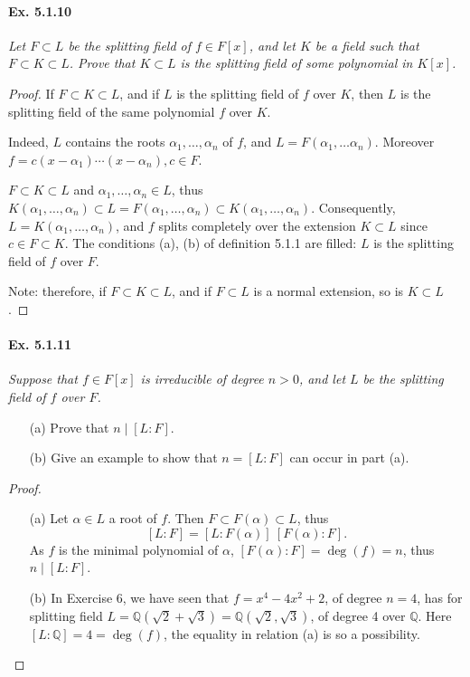 \documentclass[11pt,a4paper]{article}
\newcommand{\Q}{\mathbb{Q}}
\begin{document}
\paragraph{Ex. 5.1.10}

{\it Let $F \subset L$ be the splitting field of $f \in F[x]$, and let $K$ be a field such that $F \subset K \subset L$. Prove that $K\subset L$ is the splitting field of some polynomial in $K[x]$.
}

\begin{proof}
If $F \subset K \subset L$, and if $L$ is the splitting field of $f$ over $K$, then $L$ is the splitting field of the same polynomial $f$ over $K$.

Indeed, $L$ contains the roots $\alpha_1,\ldots,\alpha_n$ of $f$, and $L = F(\alpha_1,\ldots\alpha_n)$. Moreover $f = c(x-\alpha_1)\cdots(x-\alpha_n), c\in F$.

$F \subset K \subset L$ and $\alpha_1,\ldots,\alpha_n \in L$, thus $K(\alpha_1,\ldots,\alpha_n) \subset L = F(\alpha_1,\ldots,\alpha_n) \subset K(\alpha_1,\ldots,\alpha_n)$. Consequently, $L = K(\alpha_1,\ldots,\alpha_n)$, and $f$ splits completely over the extension $K \subset L$ since $c \in F \subset K$. The conditions (a), (b) of definition 5.1.1 are filled: $L$ is the splitting field of $f$ over $F$.

Note: therefore, if $F\subset K \subset L$, and if $F \subset L$ is a normal extension, so is $K \subset L$.
\end{proof}

\paragraph{Ex. 5.1.11}

{\it Suppose that $f \in F[x]$ is irreducible of degree $n>0$, and let $L$ be the splitting field of $f$ over $F$.
\begin{enumerate}
\item[(a)] Prove that $n \mid [L:F]$.
\item[(b)] Give an example to show that $n = [L:F]$ can occur in part (a).
\end{enumerate}
}

\begin{proof}
\begin{enumerate}
\item[(a)]
Let $\alpha \in L$ a root of $f$. Then $F \subset F(\alpha) \subset L$, thus
$$[L:F] = [L:F(\alpha)]\ [F(\alpha) : F].$$ 
As $f$ is the minimal polynomial of $\alpha$, $[F(\alpha):F] = \deg(f) = n$, thus
$n \mid [L:F]$.

\item[(b)]
In Exercise 6, we have seen that $f = x^4-4x^2+2$, of degree $n=4$,  has for splitting field $L  = \Q(\sqrt{2}+ \sqrt{3}) = \Q(\sqrt{2},\sqrt{3})$, of degree 4 over $\Q$.
Here $[L : \Q] = 4 = \deg(f)$, the equality in relation (a) is so a possibility.
\end{enumerate}
\end{proof}
\end{document}
